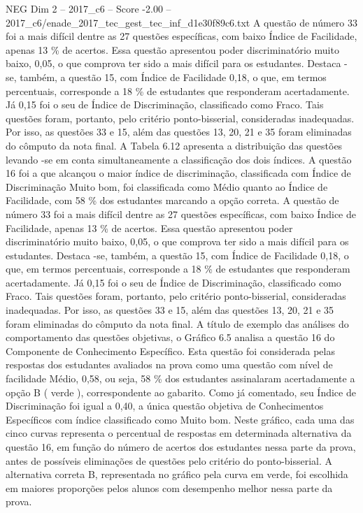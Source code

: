 \begin{textsample}{NEG Dim 2 – 2017\_c6 – Score -2.00 – 2017\_c6/enade\_2017\_tec\_gest\_tec\_inf\_d1e30f89c6.txt}
A questão de número 33 foi a mais difícil dentre as 27 questões específicas, com baixo Índice de Facilidade, apenas 13 \% de acertos.
Essa questão apresentou poder discriminatório muito baixo, 0,05, o que comprova ter sido a mais difícil para os estudantes.
Destaca -se, também, a questão 15, com Índice de Facilidade 0,18, o que, em termos percentuais, corresponde a 18 \% de estudantes que responderam acertadamente.
Já 0,15 foi o seu de Índice de Discriminação, classificado como Fraco.
Tais questões foram, portanto, pelo critério ponto-bisserial, consideradas inadequadas.
Por isso, as questões 33 e 15, além das questões 13, 20, 21 e 35 foram eliminadas do cômputo da nota final.
A Tabela 6.12 apresenta a distribuição das questões levando -se em conta simultaneamente a classificação dos dois índices.
A questão 16 foi a que alcançou o maior índice de discriminação, classificada com Índice de Discriminação Muito bom, foi classificada como Médio quanto ao Índice de Facilidade, com 58 \% dos estudantes marcando a opção correta.
A questão de número 33 foi a mais difícil dentre as 27 questões específicas, com baixo Índice de Facilidade, apenas 13 \% de acertos.
Essa questão apresentou poder discriminatório muito baixo, 0,05, o que comprova ter sido a mais difícil para os estudantes.
Destaca -se, também, a questão 15, com Índice de Facilidade 0,18, o que, em termos percentuais, corresponde a 18 \% de estudantes que responderam acertadamente.
Já 0,15 foi o seu de Índice de Discriminação, classificado como Fraco.
Tais questões foram, portanto, pelo critério ponto-bisserial, consideradas inadequadas.
Por isso, as questões 33 e 15, além das questões 13, 20, 21 e 35 foram eliminadas do cômputo da nota final.
A título de exemplo das análises do comportamento das questões objetivas, o Gráfico 6.5 analisa a questão 16 do Componente de Conhecimento Específico.
Esta questão foi considerada pelas respostas dos estudantes avaliados na prova como uma questão com nível de facilidade Médio, 0,58, ou seja, 58 \% dos estudantes assinalaram acertadamente a opção B ( verde ), correspondente ao gabarito.
Como já comentado, seu Índice de Discriminação foi igual a 0,40, a única questão objetiva de Conhecimentos Específicos com índice classificado como Muito bom.
Neste gráfico, cada uma das cinco curvas representa o percentual de respostas em determinada alternativa da questão 16, em função do número de acertos dos estudantes nessa parte da prova, antes de possíveis eliminações de questões pelo critério do ponto-bisserial.
A alternativa correta B, representada no gráfico pela curva em verde, foi escolhida em maiores proporções pelos alunos com desempenho melhor nessa parte da prova.

\end{textsample}
